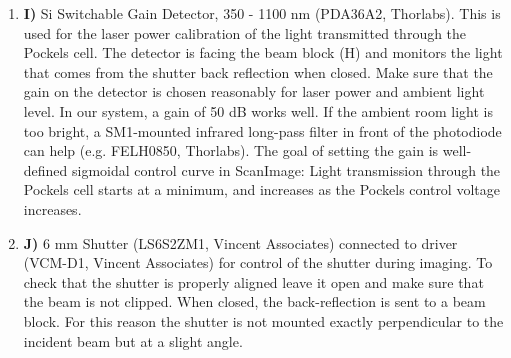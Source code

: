 \documentclass[10pt,letterpaper]{article}
\begin{document}
\begin{enumerate}[]
    \item \textbf{I)} Si Switchable Gain Detector, 350 - 1100 nm (PDA36A2, Thorlabs). This is used for the laser power calibration  of the light transmitted through the Pockels cell.  The detector is facing the beam block (H) and monitors the light that comes from the shutter back reflection when closed. Make sure that the gain on the detector is chosen reasonably for laser power and ambient light level. In our system, a gain of 50 dB works well. If the ambient room light is too bright, a SM1-mounted infrared long-pass filter in front of the photodiode can help (e.g. FELH0850, Thorlabs). The goal of setting the gain is well-defined sigmoidal control curve in ScanImage: Light transmission through the Pockels cell starts at a minimum, and increases as the Pockels control voltage increases.
        
    \item \textbf{J)} 6 mm Shutter (LS6S2ZM1, Vincent Associates) connected to driver (VCM-D1, Vincent Associates) for control of the shutter during imaging. To check that the shutter is properly aligned leave it open and make sure that the beam is not clipped. When closed, the back-reflection is sent to a beam block. For this reason the shutter is not mounted exactly perpendicular to the incident beam but at a slight angle. 


\end{enumerate}
\end{document}
